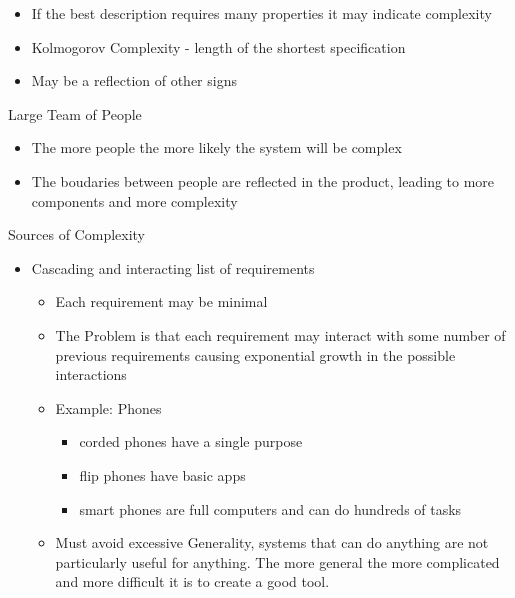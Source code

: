 \documentclass{report}
\begin{document}
\begin{description}
        \begin{itemize}
            \item If the best description requires many properties it may indicate
                complexity
            \item Kolmogorov Complexity - length of the shortest specification
            \item May be a reflection of other signs
        \end{itemize}
    \item Large Team of People
        \begin{itemize}
            \item The more people the more likely the system will be complex
            \item The boudaries between people are reflected in the product,
                leading to more components and more complexity
        \end{itemize}
    \item Sources of Complexity
        \begin{itemize}
            \item Cascading and interacting list of requirements
                \begin{itemize}
                    \item Each requirement may be minimal
                    \item The Problem is that each requirement may interact with some
                        number of previous requirements causing exponential growth
                        in the possible interactions
                    \item Example: Phones
                        \begin{itemize}
                            \item corded phones have a single purpose
                            \item flip phones have basic apps
                            \item smart phones are full computers and can do hundreds of tasks
                        \end{itemize}
                    \item Must avoid excessive Generality, systems that can do anything are not
                        particularly useful for anything. The more general the more complicated
                        and more difficult it is to create a good tool.
                \end{itemize}

\end{itemize}
\end{description}
\end{document}
